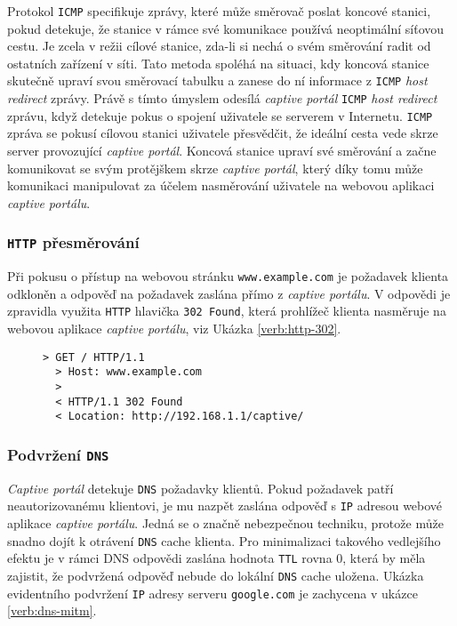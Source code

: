 \documentclass[thesis=M,czech]{FITthesis}[2012/10/20]
\renewcommand{\lstlistingname}{Ukázka kódu}
\begin{document}
Protokol \texttt{ICMP} specifikuje zprávy, které může směrovač poslat koncové stanici, pokud detekuje, že stanice v rámce své komunikace používá neoptimální síťovou cestu. Je zcela v režii cílové stanice, zda-li si nechá o svém směrování radit od ostatních zařízení v síti. Tato metoda spoléhá na situaci, kdy koncová stanice skutečně upraví svou směrovací tabulku a zanese do ní informace z \texttt{ICMP} \textit{host redirect} zprávy. Právě s tímto úmyslem odesílá \textit{captive portál} \texttt{ICMP} \textit{host redirect} zprávu, když detekuje pokus o spojení uživatele se serverem v Internetu. \texttt{ICMP} zpráva se pokusí cílovou stanici uživatele přesvědčit, že ideální cesta vede skrze server provozující \textit{captive portál}. Koncová stanice upraví své směrování a začne komunikovat se svým protějškem skrze \textit{captive portál}, který díky tomu může komunikaci manipulovat za účelem nasměrování uživatele na webovou aplikaci \textit{captive portálu}.

\subsubsection{\texttt{HTTP} přesměrování}
Při pokusu o přístup na webovou stránku \texttt{www.example.com} je požadavek klienta odkloněn a odpověď na požadavek zaslána přímo z \textit{captive portálu}. V odpovědi je zpravidla využita \texttt{HTTP} hlavička \texttt{302 Found}, která prohlížeč klienta nasměruje na webovou aplikace \textit{captive portálu}, viz Ukázka \ref{verb:http-302}.

\begin{figure}[h]
  \renewcommand{\lstlistingname}{Ukázka}
  \begin{lstlisting}[label=verb:http-302, caption={Ukázka přesměrování HTTP požadavku (zkráceno)},frame=single]
  > GET / HTTP/1.1
  > Host: www.example.com
  >
  < HTTP/1.1 302 Found
  < Location: http://192.168.1.1/captive/
  \end{lstlisting}
\end{figure}



\subsubsection{Podvržení \texttt{DNS}}

\textit{Captive portál} detekuje \texttt{DNS} požadavky klientů. Pokud požadavek patří neautorizovanému klientovi, je mu nazpět zaslána odpověď s \texttt{IP} adresou webové aplikace \textit{captive portálu}. Jedná se o značně nebezpečnou techniku, protože může snadno dojít k otrávení \texttt{DNS} cache klienta. Pro minimalizaci takového vedlejšího efektu je v rámci DNS odpovědi zaslána hodnota \texttt{TTL} rovna 0, která by měla zajistit, že podvržená odpověď nebude do lokální \texttt{DNS} cache uložena. Ukázka evidentního podvržení \texttt{IP} adresy serveru \texttt{google.com} je zachycena v ukázce \ref{verb:dns-mitm}.
\end{document}

